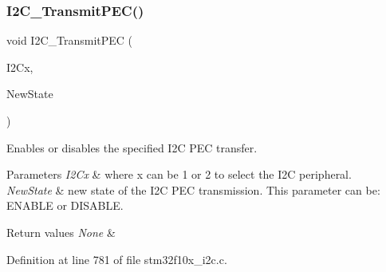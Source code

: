 \subsubsection{\texorpdfstring{I2\+C\+\_\+\+Transmit\+P\+E\+C()}{I2C\_TransmitPEC()}}
{\footnotesize\ttfamily void I2\+C\+\_\+\+Transmit\+P\+EC (\begin{DoxyParamCaption}\item[{\hyperlink{struct_i2_c___type_def}{I2\+C\+\_\+\+Type\+Def} $\ast$}]{I2\+Cx,  }\item[{\hyperlink{group___exported__types_gac9a7e9a35d2513ec15c3b537aaa4fba1}{Functional\+State}}]{New\+State }\end{DoxyParamCaption})}



Enables or disables the specified I2C P\+EC transfer. 


\begin{DoxyParams}{Parameters}
{\em I2\+Cx} & where x can be 1 or 2 to select the I2C peripheral. \\
\hline
{\em New\+State} & new state of the I2C P\+EC transmission. This parameter can be\+: E\+N\+A\+B\+LE or D\+I\+S\+A\+B\+LE. \\
\hline
\end{DoxyParams}

\begin{DoxyRetVals}{Return values}
{\em None} & \\
\hline
\end{DoxyRetVals}


Definition at line 781 of file stm32f10x\+\_\+i2c.\+c.

